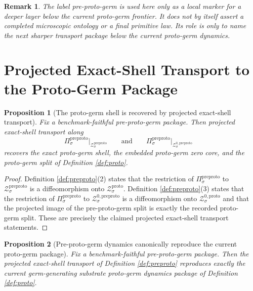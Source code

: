\documentclass[11pt]{article}
\newcommand{\ProtoShellSet}[1]{\mathcal Z_{#1}^{\mathrm{proto}}}
\newcommand{\ProtoZeroCore}[1]{\mathcal Z_{#1}^{0,\mathrm{proto}}}
\newcommand{\PreProtoProj}[1]{\Pi_{#1}^{\mathrm{preproto}}}
\newcommand{\PreProtoShellSet}[1]{\mathcal Z_{#1}^{\mathrm{preproto}}}
\newcommand{\PreProtoZeroCore}[1]{\mathcal Z_{#1}^{0,\mathrm{preproto}}}
\newtheorem{proposition}{Proposition}
\newtheorem{remark}{Remark}
\begin{document}
\begin{remark}
The label \emph{pre-proto-germ} is used here only as a local marker for a deeper layer below the current proto-germ frontier. It does not by itself assert a completed microscopic ontology or a final primitive law. Its role is only to name the next sharper transport package below the current proto-germ dynamics.
\end{remark}

\section{Projected Exact-Shell Transport to the Proto-Germ Package}

\begin{proposition}[The proto-germ shell is recovered by projected exact-shell transport]
\label{prop:shell}
Fix a benchmark-faithful pre-proto-germ package. Then projected exact-shell transport along
\[
\PreProtoProj{\sigma}\big|_{\PreProtoShellSet{\sigma}}
\qquad\text{and}\qquad
\PreProtoProj{\sigma}\big|_{\PreProtoZeroCore{\sigma}}
\]
recovers the exact proto-germ shell, the embedded proto-germ zero core, and the proto-germ split of Definition \ref{def:proto}.
\end{proposition}

\begin{proof}
Definition \ref{def:preproto}(2) states that the restriction of \(\PreProtoProj{\sigma}\) to \(\PreProtoShellSet{\sigma}\) is a diffeomorphism onto \(\ProtoShellSet{\sigma}\). Definition \ref{def:preproto}(3) states that the restriction of \(\PreProtoProj{\sigma}\) to \(\PreProtoZeroCore{\sigma}\) is a diffeomorphism onto \(\ProtoZeroCore{\sigma}\) and that the projected image of the pre-proto-germ split is exactly the recorded proto-germ split. These are precisely the claimed projected exact-shell transport statements.
\end{proof}

\begin{proposition}[Pre-proto-germ dynamics canonically reproduce the current proto-germ package]
\label{prop:proto}
Fix a benchmark-faithful pre-proto-germ package. Then the projected exact-shell transport of Definition \ref{def:preproto} reproduces exactly the current germ-generating substrate proto-germ dynamics package of Definition \ref{def:proto}.
\end{proposition}
\end{document}
